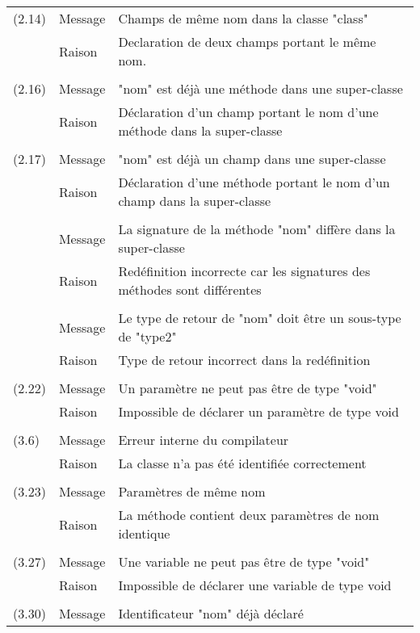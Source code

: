 \documentclass[11pt]{article}
\begin{document}
      \begin{tabular}{lll}
      (2.14) & Message & Champs de même nom dans la classe "class"\\
      & Raison & Declaration de deux champs portant le même nom.\\    
      \\
      (2.16) & Message & "nom" est déjà une méthode dans une super-classe\\  
      & Raison & Déclaration d'un champ portant le nom d'une méthode dans la super-classe\\  
      \\
      (2.17) & Message & "nom" est déjà un champ dans une super-classe\\
      & Raison & Déclaration d'une méthode portant le nom d'un champ dans la super-classe\\
      \\
      & Message & La signature de la méthode "nom" diffère dans la super-classe\\      
      & Raison & Redéfinition incorrecte car les signatures des méthodes sont différentes\\
      \\
      & Message & Le type de retour de "nom" doit être un sous-type de "type2"\\
      & Raison & Type de retour incorrect dans la redéfinition\\
      \\
      (2.22) & Message & Un paramètre ne peut pas être de type "void"\\
      & Raison & Impossible de déclarer un paramètre de type void\\
      \\
      (3.6) & Message & Erreur interne du compilateur\\
       & Raison &  La classe n'a pas été identifiée correctement\\
      \\
      (3.23) & Message & Paramètres de même nom\\
      & Raison & La méthode contient deux paramètres de nom identique\\
      \\
      (3.27) & Message & Une variable ne peut pas être de type "void"\\
      & Raison & Impossible de déclarer une variable de type void\\
      \\
      (3.30) & Message & Identificateur "nom" déjà déclaré\\

\end{tabular}
\end{document}
